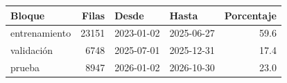 \begin{tabular}{lrllr}
\toprule
Bloque & Filas & Desde & Hasta & Porcentaje \\
\midrule
entrenamiento & 23151 & 2023-01-02 & 2025-06-27 & 59.6 \\
validación & 6748 & 2025-07-01 & 2025-12-31 & 17.4 \\
prueba & 8947 & 2026-01-02 & 2026-10-30 & 23.0 \\
\bottomrule
\end{tabular}
